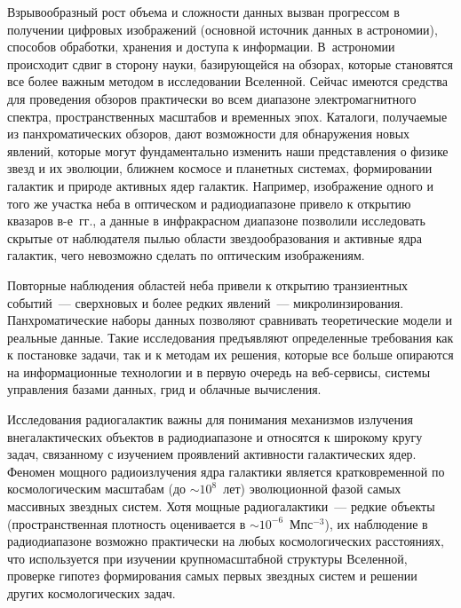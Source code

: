 \begin{multicols}{2}
      Взрывообразный рост объема и сложности данных вызван прогрессом в получении 
цифровых изоб\-ра\-же\-ний (основной источник данных в астрономии), способов обработки, 
хранения и доступа к информации. В~астрономии происходит сдвиг в сторону науки, 
базирующейся на обзорах, которые становятся все более важным методом в исследовании 
Вселенной. Сейчас имеются средства для проведения обзоров практически во всем 
диапазоне электромагнитного спектра, пространственных масштабов и временных эпох. 
Каталоги, по\-лу\-ча\-емые из панхроматических обзоров, дают возможности для обнаружения 
новых явлений, которые могут фундаментально изменить наши представления о физике 
звезд и их эволюции, ближнем космосе и планетных сис\-те\-мах, формировании галактик и 
природе активных ядер галактик. Например, изоб\-ра\-же\-ние одного и того же участка неба в 
оптическом и радиодиапазоне привело к открытию квазаров в-е~гг., а 
данные в инфракрасном диапазоне позволили исследовать скрытые от наблюдателя \mbox{пылью} 
области звездообразования и активные ядра галактик, чего невозможно сделать по 
оптическим изображениям. 

Повторные наблюдения областей неба привели к открытию 
транзиентных событий~--- сверхновых и более редких явлений~--- микролинзирования. 
Панхроматические наборы данных позволяют сравнивать теоретические модели и реальные 
данные. \mbox{Такие} исследования предъявляют определенные требования как к постановке 
задачи, так и к методам их решения, которые все больше опираются на информационные 
технологии и в первую очередь на веб-сер\-ви\-сы, системы управления базами данных, грид 
и облачные вычисления. 
      
      Исследования радиогалактик важны для понимания механизмов излучения 
внегалактических объектов в радиодиапазоне и относятся к широкому кругу задач, 
связанному с изучением проявлений активности галактических ядер. Феномен мощного 
радиоизлучения ядра галактики является кратковременной по космологическим масштабам\linebreak 
(до $\sim10^8$~лет) эволюционной фазой самых массивных звездных систем. Хотя мощные 
радио\-га\-лактики~--- редкие объекты (пространственная плот\-ность оценивается в 
      $\sim10^{-6}$~Мпс$^{-3}$), их наблюдение в радиодиапазоне возможно практически на 
любых космологических расстояниях, что используется при изучении крупномасштабной 
структуры Вселенной, проверке гипотез формирования самых первых звездных систем и 
решении других космологических задач.
      

\end{multicols}
